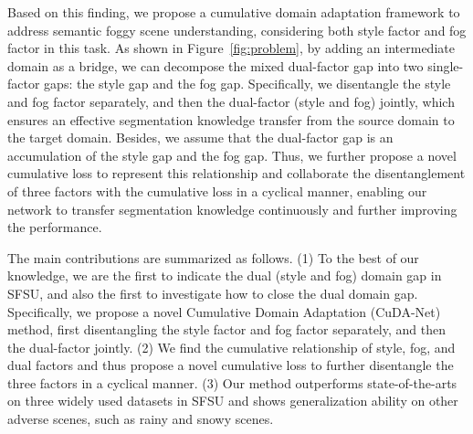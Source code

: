 \documentclass[10pt,twocolumn,letterpaper]{article}
\begin{document}
Based on this finding, we propose a cumulative domain adaptation framework to address semantic foggy scene understanding, considering both style factor and fog factor in this task. As shown in Figure~\ref{fig:problem}, by adding an intermediate domain  as a bridge, we can decompose the mixed dual-factor gap into two single-factor gaps: the style gap and the fog gap. Specifically, we disentangle the style and fog factor separately, and then the dual-factor (style and fog) jointly, which ensures an effective segmentation knowledge transfer from the source domain to the target domain.
Besides, we assume that the dual-factor gap is an accumulation of the style gap and the fog gap. Thus, we further propose a novel cumulative loss to represent this relationship and collaborate the disentanglement of three factors with the cumulative loss in a cyclical manner, enabling our network to transfer segmentation knowledge continuously and further improving the performance.








The main contributions are summarized as follows.
(1) To the best of our knowledge, we are the first to indicate the dual (style and fog) domain gap in SFSU, and also the first to investigate how to close the dual domain gap. Specifically, we propose a novel Cumulative Domain Adaptation (CuDA-Net) method, first disentangling the style factor and fog factor separately, and then the dual-factor jointly. 
(2) We find the cumulative relationship of style, fog, and dual factors and thus propose a novel cumulative loss to further disentangle the three factors in a cyclical manner.
(3) Our method outperforms state-of-the-arts on three widely used datasets in SFSU and shows generalization ability on other adverse scenes, such as rainy and snowy scenes.
\end{document}
